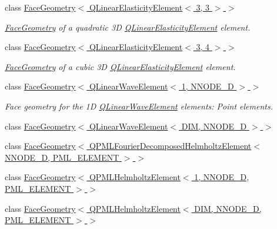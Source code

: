 \begin{DoxyCompactItemize}
class \hyperlink{classoomph_1_1FaceGeometry_3_01QLinearElasticityElement_3_013_00_013_01_4_01_4}{Face\+Geometry$<$ Q\+Linear\+Elasticity\+Element$<$ 3, 3 $>$ $>$}
\begin{DoxyCompactList}\small\item\em \hyperlink{classoomph_1_1FaceGeometry}{Face\+Geometry} of a quadratic 3D \hyperlink{classoomph_1_1QLinearElasticityElement}{Q\+Linear\+Elasticity\+Element} element. \end{DoxyCompactList}\item 
class \hyperlink{classoomph_1_1FaceGeometry_3_01QLinearElasticityElement_3_013_00_014_01_4_01_4}{Face\+Geometry$<$ Q\+Linear\+Elasticity\+Element$<$ 3, 4 $>$ $>$}
\begin{DoxyCompactList}\small\item\em \hyperlink{classoomph_1_1FaceGeometry}{Face\+Geometry} of a cubic 3D \hyperlink{classoomph_1_1QLinearElasticityElement}{Q\+Linear\+Elasticity\+Element} element. \end{DoxyCompactList}\item 
class \hyperlink{classoomph_1_1FaceGeometry_3_01QLinearWaveElement_3_011_00_01NNODE__1D_01_4_01_4}{Face\+Geometry$<$ Q\+Linear\+Wave\+Element$<$ 1, N\+N\+O\+D\+E\+\_\+D $>$ $>$}
\begin{DoxyCompactList}\small\item\em Face geometry for the 1D \hyperlink{classoomph_1_1QLinearWaveElement}{Q\+Linear\+Wave\+Element} elements\+: Point elements. \end{DoxyCompactList}\item 
class \hyperlink{classoomph_1_1FaceGeometry_3_01QLinearWaveElement_3_01DIM_00_01NNODE__1D_01_4_01_4}{Face\+Geometry$<$ Q\+Linear\+Wave\+Element$<$ D\+I\+M, N\+N\+O\+D\+E\+\_\+D $>$ $>$}
\item 
class \hyperlink{classoomph_1_1FaceGeometry_3_01QPMLFourierDecomposedHelmholtzElement_3_01NNODE__1D_00_01PML__ELEMENT_01_4_01_4}{Face\+Geometry$<$ Q\+P\+M\+L\+Fourier\+Decomposed\+Helmholtz\+Element$<$ N\+N\+O\+D\+E\+\_\+D, P\+M\+L\+\_\+\+E\+L\+E\+M\+E\+N\+T $>$ $>$}
\item 
class \hyperlink{classoomph_1_1FaceGeometry_3_01QPMLHelmholtzElement_3_011_00_01NNODE__1D_00_01PML__ELEMENT_01_4_01_4}{Face\+Geometry$<$ Q\+P\+M\+L\+Helmholtz\+Element$<$ 1, N\+N\+O\+D\+E\+\_\+D, P\+M\+L\+\_\+\+E\+L\+E\+M\+E\+N\+T $>$ $>$}
\item 
class \hyperlink{classoomph_1_1FaceGeometry_3_01QPMLHelmholtzElement_3_01DIM_00_01NNODE__1D_00_01PML__ELEMENT_01_4_01_4}{Face\+Geometry$<$ Q\+P\+M\+L\+Helmholtz\+Element$<$ D\+I\+M, N\+N\+O\+D\+E\+\_\+D, P\+M\+L\+\_\+\+E\+L\+E\+M\+E\+N\+T $>$ $>$}

\end{DoxyCompactItemize}
